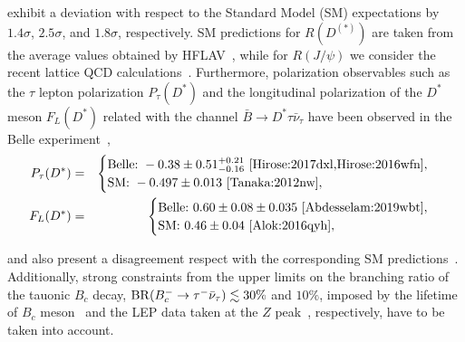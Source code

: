 \documentclass[reprint,showpacs,aps,prd,nofootinbib,superscriptaddress,longbibliography]{revtex4-1}
\begin{document}
\noindent exhibit a deviation with respect to the Standard Model (SM) expectations by $1.4\sigma$, $2.5\sigma$, and $1.8\sigma$, respectively. SM predictions for $R(D^{(\ast)})$ are taken from the average values obtained by HFLAV~\cite{HFLAVsummer}, while for $R(J/\psi)$ we consider the recent lattice QCD calculations~\cite{Harrison:2020nrv,Harrison:2020gvo}. Furthermore, polarization observables such as the $\tau$ lepton polarization $P_\tau(D^\ast)$ and the longitudinal polarization of the $D^*$ meson $F_L(D^\ast)$ related with the channel $\bar{B} \to D^\ast \tau \bar{\nu}_\tau$ have been observed in the Belle experiment~\cite{Hirose:2017dxl,Hirose:2016wfn,Abdesselam:2019wbt},
\begin{eqnarray}
P_\tau(D^\ast) &=&
\begin{cases}
\text{Belle:} \ -0.38 \pm 0.51 {}^{+0.21}_{-0.16}\text{~\cite{Hirose:2017dxl,Hirose:2016wfn}}, \\
\text{SM:} \ -0.497 \pm 0.013\text{~\cite{Tanaka:2012nw}},
\end{cases} \\
F_L(D^\ast) &=&
\begin{cases}
\text{Belle:} \ 0.60 \pm 0.08 \pm 0.035\text{~\cite{Abdesselam:2019wbt}}, \\
\text{SM:} \ 0.46 \pm 0.04\text{~\cite{Alok:2016qyh}},
\end{cases} 
\end{eqnarray}

\noindent and also present a disagreement respect with the corresponding SM predictions~\cite{Tanaka:2012nw,Alok:2016qyh}. Additionally, strong constraints from the upper limits on the branching ratio of the tauonic $B_c$ decay, ${\rm BR}(B_c^{-} \to \tau^{-} \bar{\nu}_\tau) \lesssim 30 \%$ and $10\%$, imposed by the lifetime of $B_c$ meson~\cite{Alonso:2016oyd} and the LEP data taken at the $Z$ peak~\cite{Akeroyd:2017mhr}, respectively, have to be taken into account.
 
\end{document}
